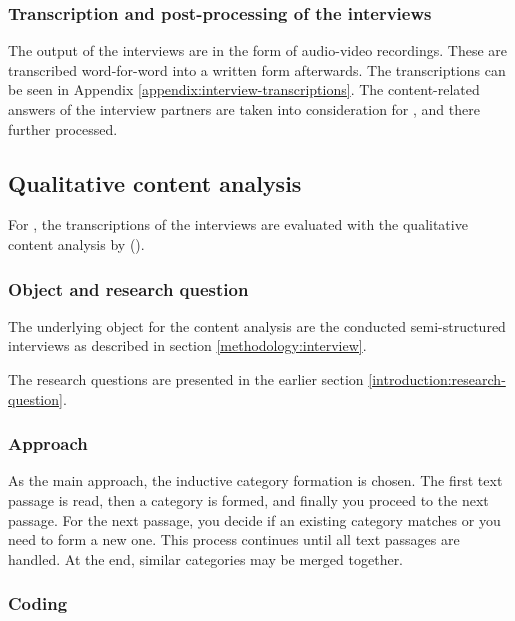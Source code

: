 \subsubsection{Transcription and post-processing of the interviews}

The output of the interviews are in the form of audio-video recordings.
These are transcribed word-for-word into a written form afterwards.
The transcriptions can be seen in Appendix \ref{appendix:interview-transcriptions}.
The content-related answers of the interview partners are taken into consideration
for , and there further processed.





\subsection{Qualitative content analysis}

For ,
the transcriptions of the interviews are evaluated with
the qualitative content analysis by
\citeauthor{mayring2019qualitative} (\citeyear{mayring2019qualitative}).

\subsubsection*{Object and research question}

The underlying object for the content analysis are
the conducted semi-structured interviews as described in section \ref{methodology:interview}.

The research questions are presented in the earlier section \ref{introduction:research-question}.

\subsubsection*{Approach}

As the main approach,
the inductive category formation
is chosen.
The first text passage is read,
then a category is formed,
and finally you proceed to the next passage.
For the next passage,
you decide if an existing category matches
or you need to form a new one.
This process continues until all text passages are handled.
At the end, similar categories may be merged together.

\subsubsection*{Coding}

